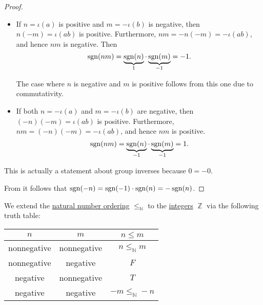\begin{proof}
\begin{itemize}
    \item If \( n = \iota(a) \) is positive and \( m = -\iota(b) \) is negative, then \( n(-m) = \iota(ab) \) is positive. Furthermore, \( nm = -n(-m) = -\iota(ab) \), and hence \( nm \) is negative. Then
    \begin{equation*}
      \operatorname{sgn}(nm) = \underbrace{\operatorname{sgn}(n)}_1 \cdot \underbrace{\operatorname{sgn}(m)}_{-1} = -1.
    \end{equation*}

    The case where \( n \) is negative and \( m \) is positive follows from this one due to commutativity.

    \item If both \( n = -\iota(a) \) and \( m = -\iota(b) \) are negative, then \( (-n)(-m) = \iota(ab) \) is positive. Furthermore, \( nm = (-n)(-m) = -\iota(ab) \), and hence \( nm \) is positive.
    \begin{equation*}
      \operatorname{sgn}(nm) = \underbrace{\operatorname{sgn}(n)}_{-1} \cdot \underbrace{\operatorname{sgn}(m)}_{-1} = 1.
    \end{equation*}
  \end{itemize}

   This is actually a statement about group inverses because \( 0 = -0 \).

   From  it follows that \( \operatorname{sgn}(-n) = \operatorname{sgn}(-1) \cdot \operatorname{sgn}(n) = -\operatorname{sgn}(n) \).
\end{proof}

\begin{definition}\label{def:integer_ordering}
  We extend the \hyperref[def:natural_numbers_ordering]{natural number ordering} \( \leq_\BbbN \) to the \hyperref[def:integers]{integers} \( \BbbZ \) via the following truth table:
  \begin{center}
    \begin{tabular}{c c c}
      \( n \) & \( m \) & \( n \leq m \) \\
      \hline
      nonnegative       & nonnegative & \( n \leq_\BbbN m \) \\
      nonnegative       & negative    & \( F \) \\
      negative          & nonnegative & \( T \) \\
      negative          & negative    & \( -m \leq_\BbbN -n \)
    \end{tabular}
  \end{center}
\end{definition}

